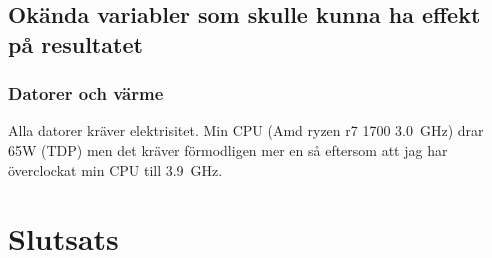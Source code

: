 \documentclass[12pt, a4paper]{report}
\begin{document}
\subsection{Okända variabler som skulle kunna ha effekt på resultatet}

\subsubsection{Datorer och värme}

Alla datorer kräver elektrisitet. Min CPU (Amd ryzen r7 1700 \SI{3.0}{\giga\hertz}) drar 65W (TDP)\cite{ryzen1700spec} men det kräver förmodligen mer en så eftersom att jag har överclockat min CPU till \SI{3.9}{\giga\hertz}.


\section{Slutsats}\label{slutsats}



\printbibliography
\end{document}

